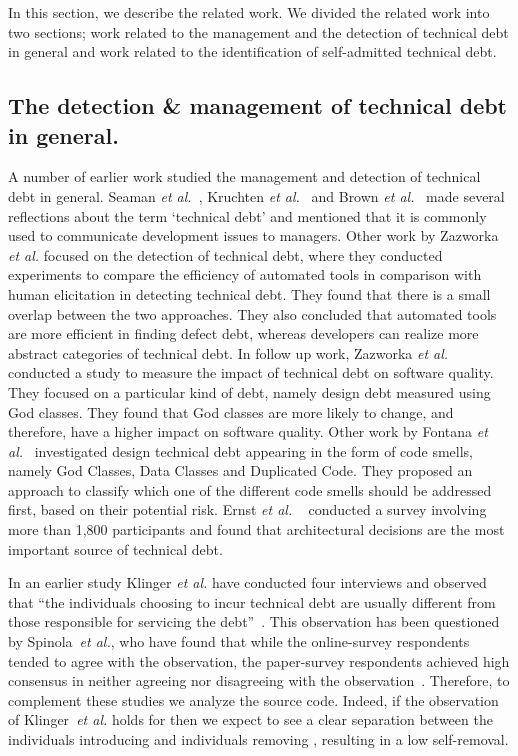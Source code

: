 
In this section, we describe the related work. We divided the related work into two sections; work related to the management and the detection of technical debt in general and work related to the identification of self-admitted technical debt.

\subsection{The detection \& management of technical debt in general.} A number of earlier work studied the management and detection of technical debt in general. Seaman \textit{et al.}~\cite{Seaman2011}, Kruchten \textit{et al.}~\cite{Kruchten2013IWMTD} and Brown \textit{et al.}~\cite{Brown2010MTD} made several reflections about the term `technical debt' and mentioned that it is commonly used to communicate development issues to managers. Other work by Zazworka \textit{et al.} \cite{Zazworka2013EASE} focused on the detection of technical debt, where they conducted experiments to compare the efficiency of automated tools in comparison with human elicitation in detecting technical debt. They found that there is a small overlap between the two approaches. They also concluded that automated tools are more efficient in finding defect debt, whereas developers can realize more abstract categories of technical debt. In follow up work, Zazworka \textit{et al.}~\cite{Zazworka2011MTD} conducted a study to measure the impact of technical debt on software quality. They focused on a particular kind of debt, namely design debt measured using God classes. They found that God classes are more likely to change, and therefore, have a higher impact on software quality. Other work by Fontana \textit{et al.}~\cite{Fontana2012MTD} investigated design technical debt appearing in the form of code smells, namely God Classes, Data Classes and Duplicated Code. They proposed an approach to classify which one of the different code smells should be addressed first, based on their potential risk. Ernst \textit{et al.} ~\cite{Ernst2015FSE} conducted a survey involving more than 1,800 participants and found that architectural decisions are the most important source of technical debt.



In an earlier study Klinger \textit{et al.} have conducted four interviews and observed that ``the individuals choosing to incur technical debt are usually different from those responsible for servicing the debt''~\cite{Klinger:etal}. 
This observation has been questioned by Spinola~\textit{et al.}, who have found that while the online-survey respondents tended to agree with the observation, the paper-survey respondents achieved high consensus in neither agreeing nor disagreeing with the observation~\cite{Spinola:etal}. Therefore, to complement these studies we analyze the source code.
Indeed, if the observation of Klinger~\textit{et al.} holds for \SATD then we expect to see a clear separation between the individuals introducing \SATD and individuals removing \SATD, resulting in a low \SATD self-removal.

